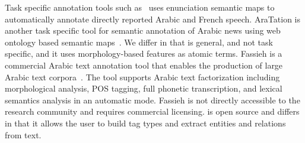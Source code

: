 Task specific annotation tools such as~\cite{alrahabi2006semantic}
uses enunciation semantic maps to automatically annotate 
directly reported Arabic and French speech. 
AraTation is another task specific tool for semantic annotation of 
Arabic news using web ontology based semantic maps~\cite{saleh2009aratation}.
We differ in that \framework is general, and not task specific, and it uses 
morphology-based features as atomic terms.
Fassieh is a commercial Arabic text annotation tool that enables the production of large 
Arabic text corpora~\cite{attia2009fassieh}. 
The tool supports Arabic text factorization including morphological analysis, POS tagging, 
full phonetic transcription, and lexical semantics analysis in an automatic mode. 
Fassieh is not directly accessible to the research community and requires commercial licensing. 
\framework is open source and differs in that it allows the user to build tag types 
and extract entities and relations from text.

